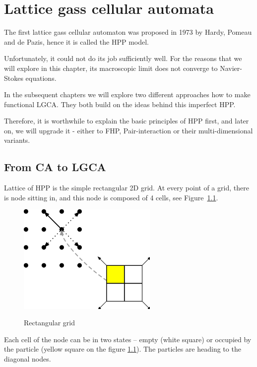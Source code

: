 \chapter{Lattice gass cellular automata}
The first lattice gass cellular automaton was proposed in 1973 by Hardy, Pomeau and de Pazis, hence it is called the HPP model.

Unfortunately, it could not do its job sufficiently well. For the reasons that we will explore in this chapter, its macroscopic limit does not converge to Navier-Stokes equations.

\bigskip

In the subsequent chapters we will explore two different approaches how to make functional LGCA. They both build on the ideas behind this imperfect HPP.

Therefore, it is worthwhile to explain the basic principles of HPP first, and later on, we will upgrade it - either to FHP, Pair-interaction or their multi-dimensional variants.

\section{From CA to LGCA}

Lattice of HPP is the simple rectangular 2D grid. At every point of a grid, there is node sitting in, and this node is composed of 4 cells, see Figure~\ref{rectangular}.

\begin{figure}[htbp]
 \centering
 \includegraphics[width=0.6\textwidth]{./img/hpp}
 \label{rectangular}
 \caption{Rectangular grid}
\end{figure}

Each cell of the node can be in two states -- empty (white square) or occupied by the particle (yellow square on the figure \ref{rectangular}).
The particles are heading to the diagonal nodes.

